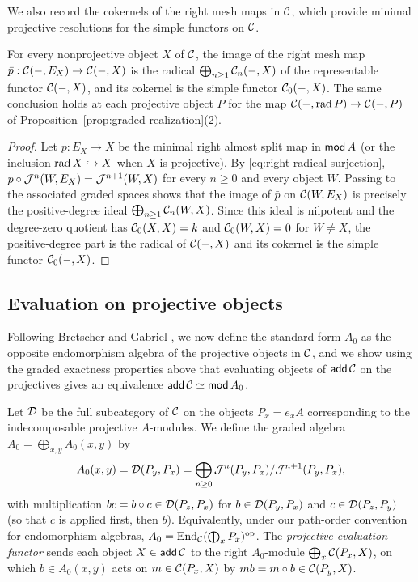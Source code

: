 We also record the cokernels of the right mesh maps in $\mathcal C$, which provide
minimal projective resolutions for the simple functors on $\mathcal C$.

\begin{lemma}
\label{lem:mesh-simple-tops}
For every nonprojective object $X$ of $\mathcal C$, the image of the right mesh map
$\bar p:\mathcal C(-,E_X)\to\mathcal C(-,X)$ is the radical $\bigoplus_{n\geq1}\mathcal C_n(-,X)$ of
the representable functor $\mathcal C(-,X)$, and its cokernel is the simple functor
$\mathcal C_0(-,X)$. The same conclusion holds at each projective object $P$ for the
map $\mathcal C(-,\operatorname{rad} P)\to\mathcal C(-,P)$ of Proposition~\ref{prop:graded-realization}(2).
\end{lemma}
\begin{proof}
Let $p:E_X\to X$ be the minimal right almost split map in $\operatorname{\mathsf{mod}} A$ (or the
inclusion $\operatorname{rad} X\hookrightarrow X$ when $X$ is projective). By
\eqref{eq:right-radical-surjection}, $p\circ \mathcal J^n(W,E_X)=\mathcal J^{n+1}(W,X)$ for
every $n\geq0$ and every object $W$. Passing to the associated graded spaces
shows that the image of $\bar p$ on $\mathcal C(W,E_X)$ is precisely the
positive-degree ideal $\bigoplus_{n\geq1}\mathcal C_n(W,X)$. Since this ideal is
nilpotent and the degree-zero quotient has $\mathcal C_0(X,X)=k$ and $\mathcal C_0(W,X)=0$
for $W\ne X$, the positive-degree part is the radical of $\mathcal C(-,X)$ and its
cokernel is the simple functor $\mathcal C_0(-,X)$.
\end{proof}

\subsection{Evaluation on projective objects}

Following Bretscher and Gabriel \cite[Section~3.1]{BretscherGabriel}, we now
define the standard form $A_0$ as the opposite endomorphism algebra of the
projective objects in $\mathcal C$, and we show using the graded exactness properties
above that evaluating objects of $\operatorname{\mathsf{add}}\mathcal C$ on the projectives gives an
equivalence $\operatorname{\mathsf{add}}\mathcal C\simeq\operatorname{\mathsf{mod}} A_0$.

\begin{construction}
\label{con:projective-algebra}
Let $\mathcal D$ be the full subcategory of $\mathcal C$ on the objects $P_x=e_x A$
corresponding to the indecomposable projective $A$-modules. We define the
graded algebra $A_0=\bigoplus_{x,y}A_0(x,y)$ by
\[
 A_0(x,y)=\mathcal D(P_y,P_x)
       =\bigoplus_{n\geq0}\mathcal J^n(P_y,P_x)/\mathcal J^{n+1}(P_y,P_x),
\]
with multiplication $bc=b\circ c\in\mathcal D(P_z,P_x)$ for $b\in\mathcal D(P_y,P_x)$ and
$c\in\mathcal D(P_z,P_y)$ (so that $c$ is applied first, then $b$). Equivalently,
under our path-order convention for endomorphism algebras,
$A_0=\operatorname{End}_{\mathcal C}(\bigoplus_x P_x)^{\mathrm{op}}$. The \emph{projective evaluation
functor} sends each object $X\in\operatorname{\mathsf{add}}\mathcal C$ to the right $A_0$-module
$\bigoplus_x\mathcal C(P_x,X)$, on which $b\in A_0(x,y)$ acts on $m\in\mathcal C(P_x,X)$ by
$mb=m\circ b\in\mathcal C(P_y,X)$.
\end{construction}

